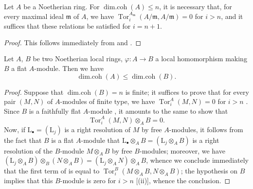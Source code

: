 \begin{corollary}[17.2.12]
\label{0.17.2.12}
Let $A$ be a Noetherian ring.
For $\operatorname{dim.coh}(A)\leq n$, it is necessary that, for every maximal ideal $\mathfrak{m}$ of $A$, we have $\operatorname{Tor}^{A_\mathfrak{m}}_i(A/\mathfrak{m},A/\mathfrak{m})=0$ for $i>n$, and it suffices that these relations be satisfied for $i=n+1$.
\end{corollary}

\begin{proof}
This follows immediately from  and .
\end{proof}

\begin{proposition}[17.2.13]
\label{0.17.2.13}
Let $A$, $B$ be two Noetherian local rings, $\varphi:A\to B$ a local homomorphism making $B$ a flat $A$-module.
Then we have
\[
\label{0.17.2.13.1}
  \operatorname{dim.coh}(A)\leq\operatorname{dim.coh}(B).
  \tag{17.2.13.1}
\]
\end{proposition}

\begin{proof}
Suppose that $\operatorname{dim.coh}(B)=n$ is finite;
it suffices to prove that for every pair $(M,N)$ of $A$-modules of finite type, we have $\operatorname{Tor}^A_i(M,N)=0$ for $i>n$ .
Since $B$ is a faithfully flat $A$-module , it amounts to the same  to show that
\[
\label{0.17.2.13.2}
  \operatorname{Tor}^A_i(M,N)\otimes_A B=0.
  \tag{17.2.13.2}
\]
Now, if $\mathrm{L}_\bullet=(\mathrm{L}_j)$ is a right resolution of $M$ by free $A$-modules, it follows from the fact that $B$ is a flat $A$-module that $\mathrm{L}_\bullet\otimes_A B=(\mathrm{L}_j\otimes_A B)$ is a right resolution of the $B$-module $M\otimes_A B$ by free $B$-modules;
moreover, we have $(\mathrm{L}_j\otimes_A B)\otimes_B(N\otimes_A B)=(\mathrm{L}_j\otimes_A N)\otimes_A B$, whence we conclude immediately that the first term of  is equal to $\operatorname{Tor}^B_i(M\otimes_A B,N\otimes_A B)$;
the hypothesis on $B$ implies that this $B$-module is zero for $i>n$ [(ii)], whence the conclusion.
\end{proof}

